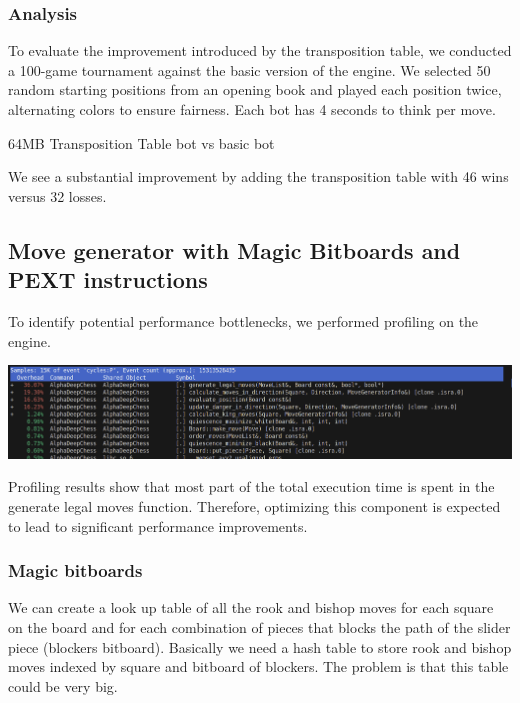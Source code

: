 \subsubsection{Analysis}

To evaluate the improvement introduced by the transposition table, we conducted a 100-game tournament against the basic version of the engine. We selected 50 random starting positions from an opening book and played each position twice, alternating colors to ensure fairness. Each bot has 4 seconds to think per move.

\begin{center}
64MB Transposition Table bot vs basic bot\\
\medskip
\end{center}

\noindent We see a substantial improvement by adding the transposition table with 46 wins versus 32 losses.

\subsection{Move generator with Magic Bitboards and PEXT instructions}

To identify potential performance bottlenecks, we performed profiling on the engine.

\begin{center}
    \includegraphics[width=1.0\textwidth]{Imagenes/basic_move_generator_profiling.png}
\end{center}

\noindent Profiling results show that most part of the total execution time is spent in the generate legal moves function. Therefore, optimizing this component is expected to lead to significant performance improvements.

\subsubsection{Magic bitboards}

We can create a look up table of all the rook and bishop moves for each square on the board and for each combination of pieces that blocks the path of the slider piece (blockers  bitboard). Basically we need a hash table to store rook and bishop moves indexed by square and bitboard of blockers. The problem is that this table could be very big.~\cite{MagicBitboards}

